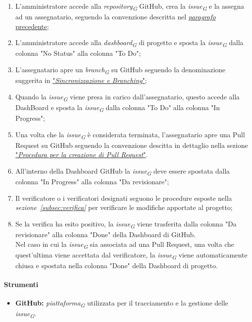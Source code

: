 \begin{enumerate}
    \item L'amministratore accede alla \textit{repository}\textsubscript{\textit{G}} GitHub, crea la \textit{issue}\textsubscript{\textit{G}} e la assegna ad un assegnatario, seguendo la convenzione descritta nel \hyperlink{par:proceduraCreazioneIssue}{\textit{paragrafo} precedente};
    \item L'amministratore accede alla \textit{dashboard}\textsubscript{\textit{G}} di progetto e sposta la \textit{issue}\textsubscript{\textit{G}} dalla colonna "No Status" alla colonna "To Do";
    \item L'assegnatario apre un \textit{branch}\textsubscript{\textit{G}} su GitHub seguendo la denominazione suggerita in \hyperlink{subsubsec:sincronizzazione&branching}{"\textit{Sincronizzazione e Branching}"};
    \item Quando la \textit{issue}\textsubscript{\textit{G}} viene presa in carico dall'assegnatario, questo accede alla DashBoard e sposta la \textit{issue}\textsubscript{\textit{G}} dalla colonna "To Do" alla colonna "In Progress";
    \item Una volta che la \textit{issue}\textsubscript{\textit{G}} è considerata terminata, l'assegnatario apre una Pull Request su GitHub seguendo la convenzione descitta in dettaglio nella sezione \hyperlink{par:creazionePR}{"\textit{Procedura per la creazione di Pull Request}"}.
    \item All'interno della Dashboard GitHub la \textit{issue}\textsubscript{\textit{G}} deve essere spostata dalla colonna "In Progress" alla colonna "Da revisionare";
    \item Il verificatore o i verificatori designati seguono le procedure esposte nella \textit{sezione~\ref{subsec:verifica}} per verificare le modifiche apportate al progetto;
    \item Se la verifica ha esito positivo, la \textit{issue}\textsubscript{\textit{G}} viene trasferita dalla colonna "Da revisionare" alla colonna "Done" della Dashboard di GitHub. \\
    Nel caso in cui la \textit{issue}\textsubscript{\textit{G}} sia associata ad una Pull Request, una volta che quest'ultima viene accettata dal verificatore, la \textit{issue}\textsubscript{\textit{G}} viene automaticamente chiusa e spostata nella colonna "Done" della Dashboard di progetto. 
\end{enumerate}

\paragraph{Strumenti}
\begin{itemize}
  \item \textbf{GitHub:} \textit{piattaforma}\textsubscript{\textit{G}} utilizzata per il tracciamento e la gestione delle \textit{issue}\textsubscript{\textit{G}}.
\end{itemize}

